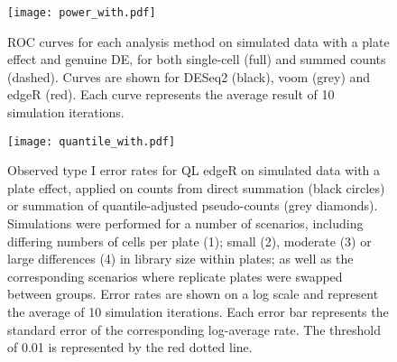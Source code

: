 \documentclass[oupdraft]{bio}
\begin{document}
\begin{figure}[!p]
\begin{center}
\texttt{[image: power\_with.pdf]}
\end{center}
\caption{
    ROC curves for each analysis method on simulated data with a plate effect and genuine DE, for both single-cell (full) and summed counts (dashed).
    Curves are shown for DESeq2 (black), voom (grey) and edgeR (red).
    Each curve represents the average result of 10 simulation iterations.
}
\label{fig:roc}
\end{figure}

\begin{figure}[!p]
\begin{center}
\texttt{[image: quantile\_with.pdf]}
\end{center}
\caption{
    Observed type I error rates for QL edgeR on simulated data with a plate effect, 
        applied on counts from direct summation (black circles) or summation of quantile-adjusted pseudo-counts (grey diamonds). 
    Simulations were performed for a number of scenarios, including differing numbers of cells per plate (1);
        small (2), moderate (3) or large differences (4) in library size within plates;
        as well as the corresponding scenarios where replicate plates were swapped between groups.
    Error rates are shown on a log scale and represent the average of 10 simulation iterations.
    Each error bar represents the standard error of the corresponding log-average rate.
    The threshold of 0.01 is represented by the red dotted line.
}
\label{fig:complexplate}
\end{figure}

\end{document}
